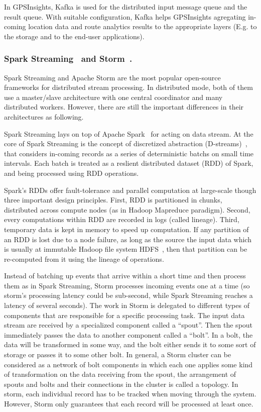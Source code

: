 \documentclass{acm_proc_article-sp}
\begin{document}
In GPSInsights, Kafka is used for the distributed input message queue and the result queue. With suitable configuration, Kafka helps GPSInsights agregating in-coming location data and route analytics results to the appropriate layers (E.g. to the storage and to the end-user applications).

\subsubsection{Spark Streaming~\cite{learningsparkbook,sparkstreamingweb} and Storm~\cite{stormappliedbook,apachestormweb}.}

Spark Streaming and Apache Storm are the most popular open-source frameworks for distributed stream processing. In distributed mode, both of them use a master/slave architecture with one central coordinator and many distributed workers. However, there are still the important differences in their architectures as following.

Spark Streaming lays on top of Apache Spark~\cite{Zaharia:2010:SCC:1863103.1863113} for acting on data stream.
 At the core of Spark Streaming is the concept of discretized abstraction (D-streams)~\cite{Zaharia:2013:DSF:2517349.2522737,Zaharia:2012:DSE:2342763.2342773}, that considers in-coming records as a series of deterministic batchs on small time intervals. Each batch is treated as a reslient distributed dataset (RDD) of Spark, and being processed using RDD operations. 

 Spark's RDDs offer fault-tolerance and parallel computation at large-scale though three important design principles. First, RDD is partitioned in chunks, distributed across compute nodes (as in Hadoop Mapreduce paradigm). Second, every computations within RDD are recorded in logs (called lineage). Third, temporary data is kept in memory to speed up computation. If any partition of an RDD is lost due to a node failure, as long as the source the input data which is usually at immutable Hadoop file system HDFS~\cite{shvachko2010hadoop}, then that partition can be re-computed from it using the lineage of operations.

Instead of batching up events that arrive within a short time and then process them as in Spark Streaming, Storm processes incoming events one at a time (so storm's processing latency could be sub-second, while Spark Streaming reaches a latency of several seconds). The work in Storm is delegated to different types of components that are responsible for a specific processing task. The input data stream are received by a specialized component called a ``spout''. Then the spout immediately passes the data to another component called a ``bolt''. In a bolt, the data will be transformed in some way, and the bolt either sends it to some sort of storage or passes it to some other bolt. In general, a Storm cluster can be considered as a network of bolt components in which each one applies some kind of transformation on the data receiving from the spout, the arrangement of spouts and bolts and their connections in the cluster is called a topology. In storm, each individual record has to be tracked when moving through the system. However, Storm only guarantees that each record will be processed at least once.
\end{document}
